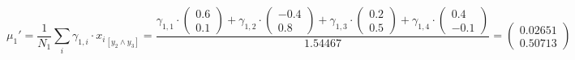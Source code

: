 \documentclass[12pt]{article}
\begin{document}
\begin{enumerate}[leftmargin=\labelsep]
        \begingroup
        \allowdisplaybreaks
        \begin{equation*}
          \mu_1' = \frac{1}{N_1} \sum_{i} \gamma_{1,i} \cdot {x_i}_{[y_2 \land y_3]}
          = \frac{\gamma_{1,1} \cdot \begin{pmatrix} 0.6 \\ 0.1 \end{pmatrix}
            + \gamma_{1,2} \cdot \begin{pmatrix} -0.4 \\ 0.8 \end{pmatrix}
            + \gamma_{1,3} \cdot \begin{pmatrix} 0.2 \\ 0.5 \end{pmatrix}
            + \gamma_{1,4} \cdot \begin{pmatrix} 0.4 \\ -0.1 \end{pmatrix}}{1.54467}
          = \begin{pmatrix} 0.02651 \\ 0.50713 \end{pmatrix}
        \end{equation*}
        \endgroup


\end{enumerate}
\end{document}
